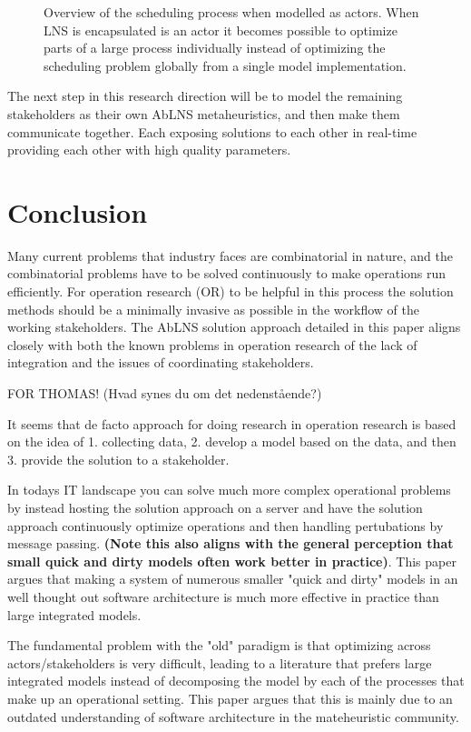 \begin{figure}[H]
	\centering
	
	\caption{
		Overview of the scheduling process when modelled as actors. When LNS is encapsulated 
		is an actor it becomes possible to optimize parts of a large process individually instead of 
		optimizing the scheduling problem globally from a single model implementation.
	}
	\label{fig:ordinator-architecture}
\end{figure}

The next step in this research direction will be to model the remaining stakeholders as their own 
AbLNS metaheuristics, and then make them communicate together. Each exposing solutions to each 
other in real-time providing each other with high quality parameters.

\section{Conclusion}
Many current problems that industry faces are combinatorial in nature, and the combinatorial 
problems have to be solved continuously to make operations run efficiently. For operation research (OR)
to be helpful in this process the solution methods should be a minimally invasive as possible in 
the workflow of the working stakeholders. The AbLNS solution approach detailed in this paper aligns
closely with both the known problems in operation research of the lack of integration and the issues of 
coordinating stakeholders. 

FOR THOMAS! (Hvad synes du om det nedenstående?)

It seems that de facto approach for doing research in operation research is based on the idea of 
1. collecting data, 2. develop a model based on the data, and then 3. provide the solution to a stakeholder.

In todays IT landscape you can solve much more complex operational problems by instead hosting the 
solution approach on a server and have the solution approach continuously optimize operations and 
then handling pertubations by message passing. \textbf{(Note this also aligns with the general
perception that small quick and dirty models often work better in practice)}. This paper argues
that making a system of numerous smaller "quick and dirty" models in an well thought out
software architecture is much more effective in practice than large integrated
models.

The fundamental problem with the "old" paradigm is that optimizing across actors/stakeholders is 
very difficult, leading to a literature that prefers large integrated models instead of decomposing the
model by each of the processes that make up an operational setting. This paper argues that this is 
mainly due to an outdated understanding of software architecture in the mateheuristic community. 
